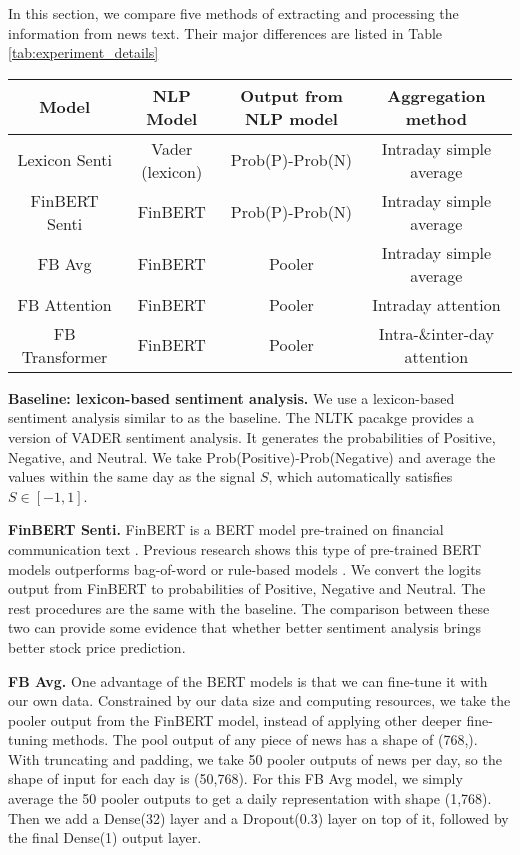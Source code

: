 \documentclass[11pt]{article}
\begin{document}
In this section, we compare five methods of extracting and processing the information from news text. Their major differences are listed in Table \ref{tab:experiment_details}

\begin{table*}[t]
  \centering
  \begin{tabular}{|c|c|c|c|}
  \hline
  Model & NLP Model & Output from NLP model & Aggregation method \\
  \hline
  Lexicon Senti & Vader (lexicon) & Prob(P)-Prob(N) & Intraday simple average \\
  FinBERT Senti & FinBERT & Prob(P)-Prob(N) & Intraday simple average \\
  FB Avg & FinBERT & Pooler & Intraday simple average \\
  FB Attention & FinBERT & Pooler & Intraday attention\\
  FB Transformer & FinBERT & Pooler &  Intra-\&inter-day attention\\
  \hline
  \end{tabular}
  \caption{Major settings of the Models}
  \label{tab:experiment_details}
\end{table*}

\textbf{Baseline: lexicon-based sentiment analysis.} We use a lexicon-based sentiment analysis similar to \citet{hao2021} as the baseline. The NLTK pacakge provides a version of VADER \citep{Hutto_Gilbert_2014} sentiment analysis. It generates the probabilities of Positive, Negative, and Neutral. We take Prob(Positive)-Prob(Negative) and average the values within the same day as the signal $S$, which automatically satisfies $S \in [-1,1]$.

\textbf{FinBERT Senti.} FinBERT is a BERT model pre-trained on financial communication text \citep{yang2020finbert}. Previous research shows this type of pre-trained BERT models outperforms bag-of-word or rule-based models \citep{yang2020finbert,ijcai2020p622,araci2019finbert}. We convert the logits output from FinBERT to probabilities of Positive, Negative and Neutral. The rest procedures are the same with the baseline. The comparison between these two can provide some evidence that whether better sentiment analysis brings better stock price prediction. 

\textbf{FB Avg.} One advantage of the BERT models is that we can fine-tune it with our own data. Constrained by our data size and computing resources, we take the pooler output from the FinBERT model, instead of applying other deeper fine-tuning methods. The pool output of any piece of news has a shape of (768,). With truncating and padding, we take 50 pooler outputs of news per day, so the shape of input for each day is (50,768). For this FB Avg model, we simply average the 50 pooler outputs to get a daily representation with shape (1,768). Then we add a Dense(32) layer and a Dropout(0.3) layer on top of it, followed by the final Dense(1) output layer.   
\end{document}

